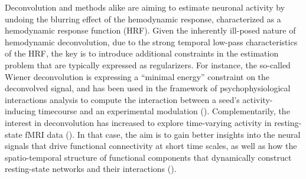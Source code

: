 Deconvolution and methods alike are aiming to estimate neuronal activity by undoing the blurring effect of the hemodynamic response, characterized as a hemodynamic response function (HRF). Given the inherently ill-posed nature of hemodynamic deconvolution, due to the strong temporal low-pass characteristics of the HRF, the key is to introduce additional constraints in the estimation problem that are typically expressed as regularizers. For instance, the so-called Wiener deconvolution is expressing a ``minimal energy'' constraint on the deconvolved signal, and has been used in the framework of psychophysiological interactions analysis to compute the interaction between a seed's activity-inducing timecourse and an experimental modulation (\citealt{Glover1999DeconvolutionImpulseResponse,Gitelman2003Modelingregionalpsychophysiologic,Gerchen2014Analyzingtaskdependent,Di2018TaskConnectomicsExamining,Freitas2020Timeresolvedeffective}). Complementarily, the interest in deconvolution has increased to explore time-varying activity in resting-state fMRI data (\citealt{Preti2017dynamicfunctionalconnectome,Keilholz2017TimeResolvedResting,Lurie2020Questionscontroversiesstudy,Bolton2020TappingMultiFaceted}). In that case, the aim is to gain better insights into the neural signals that drive functional connectivity at short time scales, as well as how the spatio-temporal structure of functional components that dynamically construct resting-state networks and their interactions (\citealt{Karahanoglu2017Dynamicslargescale}).


